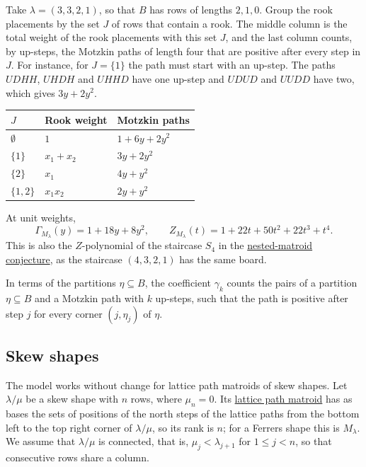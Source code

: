 \begin{example*}[Motzkin paths for $\lambda=(3,3,2,1)$]\label{schubertMatroidZExample}
Take $\lambda=(3,3,2,1)$, so that $B$ has rows of lengths $2,1,0$.  Group the
rook placements by the set $J$ of rows that contain a rook.  The middle column
is the total weight of the rook placements with this set $J$, and the last column
counts, by
up-steps, the Motzkin paths of length four that are positive after every step
in $J$.  For instance, for $J=\{1\}$ the path must start with an up-step.
The paths $UDHH$, $UHDH$ and $UHHD$ have one up-step and $UDUD$ and $UUDD$
have two, which gives $3y+2y^2$.

\begin{tabular}{lll}
\toprule
$J$ & Rook weight & Motzkin paths \\
\midrule
$\emptyset$ & $1$ & $1+6y+2y^2$ \\
$\{1\}$ & $x_1+x_2$ & $3y+2y^2$ \\
$\{2\}$ & $x_1$ & $4y+y^2$ \\
$\{1,2\}$ & $x_1x_2$ & $2y+y^2$ \\
\bottomrule
\end{tabular}

At unit weights,
\[
  \Gamma_{M_\lambda}(y)=1+18y+8y^2,\qquad
  Z_{M_\lambda}(t)=1+22t+50t^2+22t^3+t^4.
\]
This is also the $Z$-polynomial of the staircase $S_4$ in the
\hyperref[conjNestedMatroidZ]{nested-matroid conjecture}, as the staircase
$(4,3,2,1)$ has the same board.
\end{example*}

In terms of the partitions $\eta\subseteq B$, the coefficient $\gamma_k$
counts the pairs of a partition $\eta\subseteq B$ and a Motzkin path with $k$
up-steps, such that the path is positive after step $j$ for every corner
$(j,\eta_j)$ of $\eta$.


\subsection[schubertMatroidZSkew]{Skew shapes}

The model works without change for lattice path matroids of skew shapes.  Let
$\lambda/\mu$ be a skew shape with $n$ rows, where $\mu_n=0$.  Its
\hyperref[latticePathMatroids]{lattice path matroid} has as bases the sets of
positions of the north steps of the lattice paths from the bottom left to the
top right corner of $\lambda/\mu$, so its rank is $n$; for a Ferrers shape
this is $M_\lambda$.  We assume that $\lambda/\mu$ is connected, that is,
$\mu_j<\lambda_{j+1}$ for $1\leq j<n$, so that consecutive rows share a
column.

